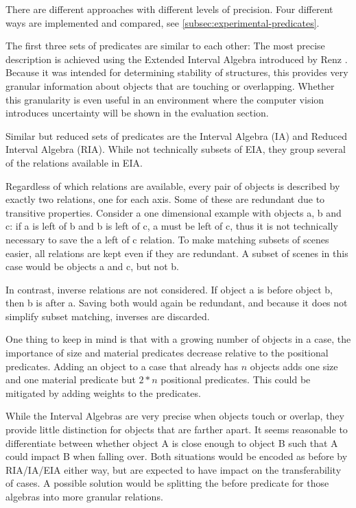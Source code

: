 There are different approaches with different levels of precision. Four different ways are implemented and compared, see \ref{subsec:experimental-predicates}.

The first three sets of predicates are similar to each other:
The most precise description is achieved using the Extended Interval Algebra introduced by Renz \cite{Renz-ERA}. Because it was intended for determining stability of structures, this provides very granular information about objects that are touching or overlapping.
Whether this granularity is even useful in an environment where the computer vision introduces uncertainty will be shown in the evaluation section.

Similar but reduced sets of predicates are the Interval Algebra (IA) and Reduced Interval Algebra (RIA). While not technically subsets of EIA, they group several of the relations available in EIA.



Regardless of which relations are available, every pair of objects is described by exactly two relations, one for each axis. Some of these are redundant due to transitive properties.
Consider a one dimensional example with objects a, b and c: if a is left of b and b is left of c, a must be left of c, thus it is not technically necessary to save the a left of c relation.
To make matching subsets of scenes easier, all relations are kept even if they are redundant. A subset of scenes in this case would be objects a and c, but not b.

In contrast, inverse relations are not considered. If object a is before object b, then b is after a. Saving both would again be redundant, and because it does not simplify subset matching, inverses are discarded.

One thing to keep in mind is that with a growing number of objects in a case, the importance of size and material predicates decrease relative to the positional predicates. Adding an object to a case that already has $n$ objects adds one size and one material predicate but $2*n$ positional predicates. This could be mitigated by adding weights to the predicates.

While the Interval Algebras are very precise when objects touch or overlap, they provide little distinction for objects that are farther apart. It seems reasonable to differentiate between whether object A is close enough to object B such that A could impact B when falling over. Both situations would be encoded as before by RIA/IA/EIA either way, but are expected to have impact on the transferability of cases.
A possible solution would be splitting the before predicate for those algebras into more granular relations.

